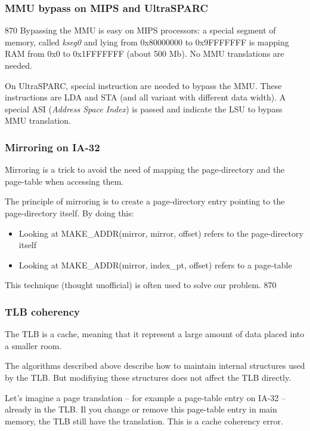 
\begin{frame}
  \frametitle{MMU bypass on MIPS and UltraSPARC}
870
  Bypassing the MMU is easy on MIPS processors: a special segment of
  memory, called \emph{kseg0} and lying from 0x80000000 to 0x9FFFFFFF
  is mapping RAM from 0x0 to 0x1FFFFFFF (about 500 Mb). No MMU
  translations are needed.

  \-

  On UltraSPARC, special instruction are needed to bypass the
  MMU. These instructions are LDA and STA (and all variant with
  different data width). A special ASI (\emph{Address Space Index}) is
  passed and indicate the LSU to bypass MMU translation.

\end{frame}


\begin{frame}
  \frametitle{Mirroring on IA-32}

  Mirroring is a trick to avoid the need of mapping the page-directory
  and the page-table when accessing them.

  \-

  The principle of mirroring is to create a page-directory entry
  pointing to the page-directory itself. By doing this:

  \begin{itemize}
  \item
    Looking at MAKE\_ADDR(mirror, mirror, offset) refers to the
    page-directory itself
  \item
    Looking at MAKE\_ADDR(mirror, index\_pt, offset) refers to a
    page-table
  \end{itemize}

  \-

  This technique (thought unofficial) is often used to solve our problem.
870
\end{frame}


\begin{frame}
  \frametitle{TLB coherency}

  The TLB is a cache, meaning that it represent a large amount of data
  placed into a smaller room.

  \-

  The algorithms described above describe how to maintain internal
  structures used by the TLB. But modifiying these structures does not
  affect the TLB directly.

  \-

  Let's imagine a page translation -- for example a page-table entry
  on IA-32 -- already in the TLB. Il you change or remove this
  page-table entry in main memory, the TLB still have the
  translation. This is a cache coherency error.

\end{frame}

